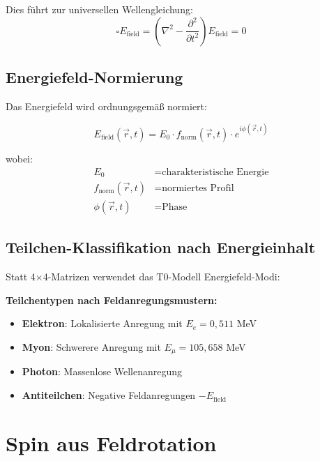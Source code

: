 \documentclass[12pt,a4paper]{report}
\begin{document}
	Dies führt zur universellen Wellengleichung:
	\begin{equation}
		\boxed{\square E_{\text{field}} = \left(\nabla^2 - \frac{\partial^2}{\partial t^2}\right) E_{\text{field}} = 0}
		\label{eq:universal_wave_equation}
	\end{equation}
	
	\subsection{Energiefeld-Normierung}
	\label{subsec:energy_field_normalization}
	
	Das Energiefeld wird ordnungsgemäß normiert:
	
	\begin{equation}
		E_{\text{field}}(\vec{r}, t) = E_0 \cdot f_{\text{norm}}(\vec{r}, t) \cdot e^{i\phi(\vec{r}, t)}
	\end{equation}
	
	wobei:
	\begin{align}
		E_0 &= \text{charakteristische Energie} \\
		f_{\text{norm}}(\vec{r}, t) &= \text{normiertes Profil} \\
		\phi(\vec{r}, t) &= \text{Phase}
	\end{align}
	
	\subsection{Teilchen-Klassifikation nach Energieinhalt}
	\label{subsec:particle_classification}
	
	Statt 4×4-Matrizen verwendet das T0-Modell Energiefeld-Modi:
	
	\textbf{Teilchentypen nach Feldanregungsmustern:}
	\begin{itemize}
		\item \textbf{Elektron}: Lokalisierte Anregung mit $E_e = 0,511$ MeV
		\item \textbf{Myon}: Schwerere Anregung mit $E_\mu = 105,658$ MeV  
		\item \textbf{Photon}: Massenlose Wellenanregung
		\item \textbf{Antiteilchen}: Negative Feldanregungen $-E_{\text{field}}$
	\end{itemize}
	
	\section{Spin aus Feldrotation}
	\label{sec:spin_from_rotation}
	
\end{document}
